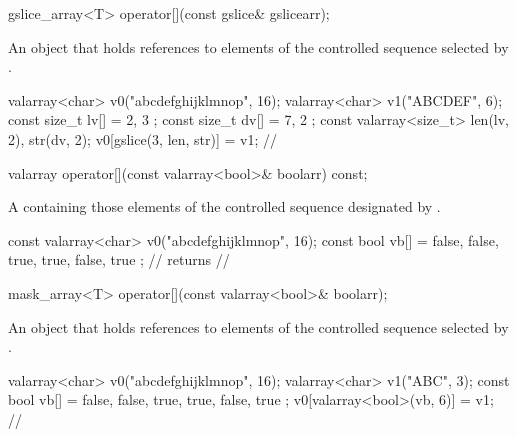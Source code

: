 %
\begin{itemdecl}
gslice_array<T> operator[](const gslice& gslicearr);
\end{itemdecl}

\begin{itemdescr}
\pnum
\returns An object that holds references to elements of the controlled
sequence selected by . \begin{example}
\begin{codeblock}
valarray<char> v0("abcdefghijklmnop", 16);
valarray<char> v1("ABCDEF", 6);
const size_t lv[] = { 2, 3 };
const size_t dv[] = { 7, 2 };
const valarray<size_t> len(lv, 2), str(dv, 2);
v0[gslice(3, len, str)] = v1;
// 
\end{codeblock}
\end{example}
\end{itemdescr}

%
\begin{itemdecl}
valarray operator[](const valarray<bool>& boolarr) const;
\end{itemdecl}

\begin{itemdescr}
\pnum
\returns A  containing those
elements of the controlled sequence designated by .
\begin{example}
\begin{codeblock}
const valarray<char> v0("abcdefghijklmnop", 16);
const bool vb[] = { false, false, true, true, false, true };
//  returns
// 
\end{codeblock}
\end{example}
\end{itemdescr}

%
\begin{itemdecl}
mask_array<T> operator[](const valarray<bool>& boolarr);
\end{itemdecl}

\begin{itemdescr}
\pnum
\returns An object that holds references to elements of the controlled
sequence selected by . \begin{example}
\begin{codeblock}
valarray<char> v0("abcdefghijklmnop", 16);
valarray<char> v1("ABC", 3);
const bool vb[] = { false, false, true, true, false, true };
v0[valarray<bool>(vb, 6)] = v1;
// 
\end{codeblock}
\end{example}
\end{itemdescr}

